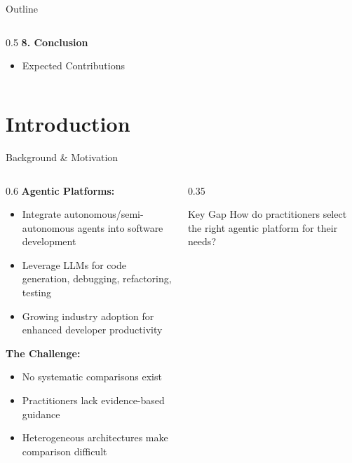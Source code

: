 \documentclass[aspectratio=169]{beamer}
\begin{document}
\begin{frame}{Outline}
\begin{columns}[t]
\begin{column}{0.5\textwidth}
            \vspace{0.3cm}
            \textbf{8. Conclusion}
            \begin{itemize}
                \item Expected Contributions
            \end{itemize}
        \end{column}
    \end{columns}
\end{frame}

\section{Introduction}

\begin{frame}{Background \& Motivation}
    \begin{columns}
        \begin{column}{0.6\textwidth}
            \textbf{Agentic Platforms:}
            \begin{itemize}
                \item Integrate autonomous/semi-autonomous agents into software development
                \item Leverage LLMs for code generation, debugging, refactoring, testing
                \item Growing industry adoption for enhanced developer productivity
            \end{itemize}

            \vspace{0.5cm}
            \textbf{The Challenge:}
            \begin{itemize}
                \item No systematic comparisons exist
                \item Practitioners lack evidence-based guidance
                \item Heterogeneous architectures make comparison difficult
            \end{itemize}
        \end{column}
        \begin{column}{0.35\textwidth}
            \begin{block}{Key Gap}
                How do practitioners select the right agentic platform for their needs?
            \end{block}
        \end{column}
    \end{columns}
\end{frame}
\end{document}
